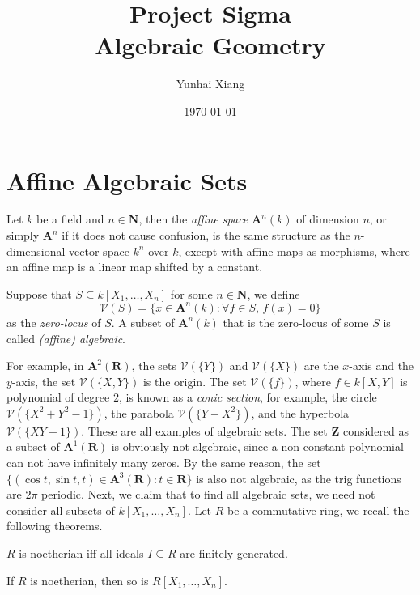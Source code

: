 \documentclass[11pt]{book}
\title{
\vspace{-2.0cm}
\Large{Project Sigma}\\
\vspace{1cm}
\huge{\bf{Algebraic Geometry}}
\vspace{3cm}}
\author{Yunhai Xiang}
\date{\today}
\begin{document}
\maketitle
\doublespacing
\tableofcontents
\singlespacing
\newpage
\chapter{Affine Algebraic Sets}
Let $k$ be a field and $n\in\mathbf N$, then the \textit{affine space} $\mathbf A^n(k)$ of dimension $n$, or simply $\mathbf A^n$ if it does not cause confusion, is the same structure as the $n$-dimensional vector space $k^n$ over $k$, except with affine maps as morphisms, where an affine map is a linear map shifted by a constant. 

\begin{definition}
Suppose that $S\subseteq k[X_1,\dots,X_n]$ for some $n\in\mathbf N$, we define
\[\mathcal{V}(S)=\{x\in \mathbf A^n(k):\forall f\in S,\,f(x)=0\}\]
as the \textit{zero-locus} of $S$. A subset of $\mathbf A^n(k)$ that is the zero-locus of some $S$ is called \textit{(affine) algebraic}.
\end{definition}
For example, in $\mathbf{A}^2(\mathbf R)$, the sets $\mathcal{V}(\{Y\})$ and $\mathcal{V}(\{X\})$ are the $x$-axis and the $y$-axis, the set $\mathcal{V}(\{X,Y\})$ is the origin. The set $\mathcal{V}(\{f\})$, where $f\in k[X,Y]$ is polynomial of degree $2$, is known as a \textit{conic section}, for example, the circle $\mathcal{V}(\{X^2+Y^2-1\})$, the parabola $\mathcal{V}(\{Y-X^2\})$, and the hyperbola $\mathcal{V}(\{XY-1\})$. These are all examples of algebraic sets. The set $\mathbf Z$ considered as a subset of $\mathbf A^1(\mathbf R)$ is obviously not algebraic, since a non-constant polynomial can not have infinitely many zeros. By the same reason, the set $\{(\cos t,\sin t,t)\in\mathbf A^3(\mathbf R):t\in\mathbf R\}$ is also not algebraic, as the trig functions are $2\pi$ periodic. Next, we claim that to find all algebraic sets, we need not consider all subsets of $k[X_1,\dots,X_n]$. Let $R$ be a commutative ring, we recall the following theorems.
\begin{theorem}$R$ is noetherian iff all ideals $I\subseteq R$ are finitely generated.
\end{theorem}
\begin{theorem}If $R$ is noetherian, then so is $R[X_1,\dots,X_n]$.
\end{theorem}
\end{document}
